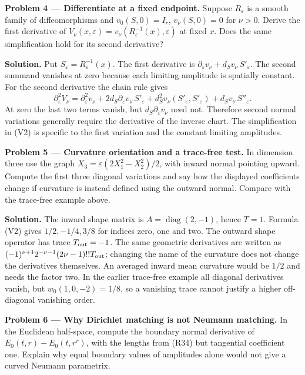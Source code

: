 \documentclass[
  11pt,
]{article}
\begin{document}
\textbf{Problem 4 --- Differentiate at a fixed endpoint.} Suppose
\(R_\varepsilon\) is a smooth family of diffeomorphisms and
\(v_0(S,0)=I_r\), \(v_\nu(S,0)=0\) for \(\nu>0\). Derive the first
derivative of
\(V_\nu(x,\varepsilon)=v_\nu(R_\varepsilon^{-1}(x),\varepsilon)\) at
fixed \(x\). Does the same simplification hold for its second
derivative?

\textbf{Solution.} Put \(S_\varepsilon=R_\varepsilon^{-1}(x)\). The
first derivative is
\(\partial_\varepsilon v_\nu+d_Sv_\nu\,S'_\varepsilon\). The second
summand vanishes at zero because each limiting amplitude is spatially
constant. For the second derivative the chain rule gives \[
 \partial_\varepsilon^2V_\nu
 =\partial_\varepsilon^2v_\nu
 +2d_S\partial_\varepsilon v_\nu\,S'_\varepsilon
 +d_S^2v_\nu(S'_\varepsilon,S'_\varepsilon)
 +d_Sv_\nu\,S''_\varepsilon.                               \tag{R37}
\] At zero the last two terms vanish, but
\(d_S\partial_\varepsilon v_\nu\) need not. Therefore second normal
variations generally require the derivative of the inverse chart. The
simplification in (V2) is specific to the first variation and the
constant limiting amplitudes.

\textbf{Problem 5 --- Curvature orientation and a trace-free test.} In
dimension three use the graph \(X_3=\varepsilon(2X_1^2-X_2^2)/2\), with
inward normal pointing upward. Compute the first three diagonal
variations and say how the displayed coefficients change if curvature is
instead defined using the outward normal. Compare with the trace-free
example above.

\textbf{Solution.} The inward shape matrix is
\(A=\operatorname{diag}(2,-1)\), hence \(T=1\). Formula (V2) gives
\(1/2,-1/4,3/8\) for indices zero, one and two. The outward shape
operator has trace \(T_{\rm out}=-1\). The same geometric derivatives
are written as \((-1)^{\nu+1}2^{-\nu-1}(2\nu-1)!!T_{\rm out}\); changing
the name of the curvature does not change the derivatives themselves. An
averaged inward mean curvature would be \(1/2\) and needs the factor
two. In the earlier trace-free example all diagonal derivatives vanish,
but \(w_0(1,0,-2)=1/8\), so a vanishing trace cannot justify a higher
off-diagonal vanishing order.

\textbf{Problem 6 --- Why Dirichlet matching is not Neumann matching.}
In the Euclidean half-space, compute the boundary normal derivative of
\(E_0(t,r)-E_0(t,r^r)\), with the lengths from (R34) but tangential
coefficient one. Explain why equal boundary values of amplitudes alone
would not give a curved Neumann parametrix.
\end{document}
